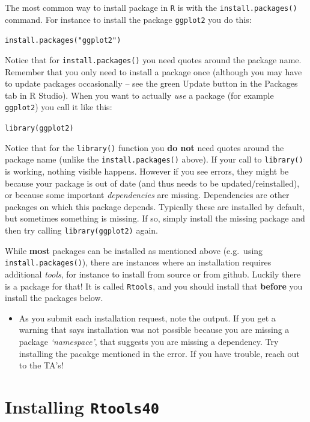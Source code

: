 \documentclass[
]{book}
\newcommand{\passthrough}[1]{#1}
\newenvironment{rmdblock}[1]
  {%
  \begin{itemize}
  \renewcommand{\labelitemi}{
    \raisebox{-.7\height}[0pt][0pt]{
      {\setkeys{Gin}{width=3em,keepaspectratio}\texttt{[image: images/\#1]}}
    }
  }
  \item
  }
  {
  \end{itemize}
  }
\newenvironment{rmdcaution}
  {\begin{rmdblock}{caution}}
  {\end{rmdblock}}
\begin{document}
The most common way to install package in \passthrough{\lstinline!R!} is with the \passthrough{\lstinline!install.packages()!} command. For instance to install the package \passthrough{\lstinline!ggplot2!} you do this:

\passthrough{\lstinline!install.packages("ggplot2")!}

Notice that for \passthrough{\lstinline!install.packages()!} you need quotes around the package name. Remember that you only need to install a package once (although you may have to update packages occasionally -- see the green Update button in the Packages tab in R Studio). When you want to actually \emph{use} a package (for example \passthrough{\lstinline!ggplot2!}) you call it like this:

\passthrough{\lstinline!library(ggplot2)!}

Notice that for the \passthrough{\lstinline!library()!} function you \textbf{do not} need quotes around the package name (unlike the \passthrough{\lstinline!install.packages()!} above). If your call to \passthrough{\lstinline!library()!} is working, nothing visible happens. However if you see errors, they might be because your package is out of date (and thus needs to be updated/reinstalled), or because some important \emph{dependencies} are missing. Dependencies are other packages on which this package depends. Typically these are installed by default, but sometimes something is missing. If so, simply install the missing package and then try calling \passthrough{\lstinline!library(ggplot2)!} again.

While \textbf{most} packages can be installed as mentioned above (e.g.~using \passthrough{\lstinline!install.packages()!}), there are instances where an installation requires additional \emph{tools}, for instance to install from source or from github. Luckily there is a package for that! It is called \passthrough{\lstinline!Rtools!}, and you should install that \textbf{before} you install the packages below.

\begin{rmdcaution}
As you submit each installation request, note the output. If you get a warning that says installation was not possible because you are missing a package \emph{`namespace'}, that suggests you are missing a dependency. Try installing the pacakge mentioned in the error. If you have trouble, reach out to the TA's!
\end{rmdcaution}

\hypertarget{installing-rtools40}{%
\section*{\texorpdfstring{Installing \texttt{Rtools40}}{Installing Rtools40}}\label{installing-rtools40}}
\end{document}
